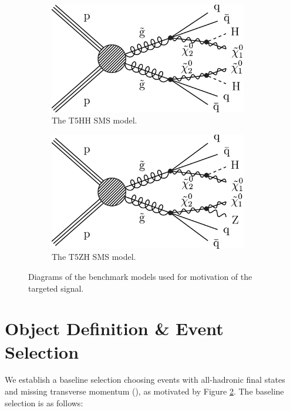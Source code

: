 \begin{figure}[hb!]
\centering
\begin{subfigure}[b]{0.425\textwidth}
\includegraphics[width=0.95\textwidth]{figs/CMS-SUS-17-006_Figure_001.pdf}
\caption{The T5HH SMS model.}
\label{fig:t5hh}
\end{subfigure}
\begin{subfigure}[b]{0.425\textwidth}
\includegraphics[width=0.95\textwidth]{figs/CMS-SUS-17-006_Figure-aux_001.pdf}
\caption{The T5ZH SMS model.}
\end{subfigure}
\caption{Diagrams of the benchmark models used for motivation of the targeted signal.}
\label{fig:sms}
\end{figure}

\section{Object Definition \& Event Selection}

We establish a baseline selection choosing events with all-hadronic final states and missing transverse momentum (\ptmiss), as motivated by Figure \ref{fig:sms}. The baseline selection is as follows:

